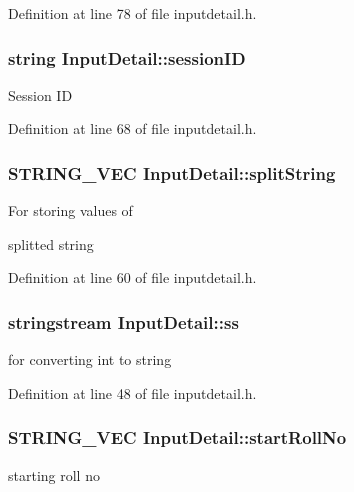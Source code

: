 Definition at line 78 of file inputdetail.\-h.

\hypertarget{classInputDetail_a1f276e4df260009d465032ec64f3a543}{
\subsubsection[{session\-I\-D}]{\setlength{\rightskip}{0pt plus 5cm}string Input\-Detail\-::session\-I\-D\hspace{0.3cm}{\ttfamily [protected]}}}\label{classInputDetail_a1f276e4df260009d465032ec64f3a543}
Session I\-D 

Definition at line 68 of file inputdetail.\-h.

\hypertarget{classInputDetail_ab09ed4176090a72237531cedf00afb41}{
\subsubsection[{split\-String}]{\setlength{\rightskip}{0pt plus 5cm}S\-T\-R\-I\-N\-G\-\_\-\-V\-E\-C Input\-Detail\-::split\-String\hspace{0.3cm}{\ttfamily [protected]}}}\label{classInputDetail_ab09ed4176090a72237531cedf00afb41}
\begin{DoxyVerb}        For storing values of 
\end{DoxyVerb}
 splitted string 

Definition at line 60 of file inputdetail.\-h.

\hypertarget{classInputDetail_a5284736b5fd3db0251cfeab7c581c0bd}{
\subsubsection[{ss}]{\setlength{\rightskip}{0pt plus 5cm}stringstream Input\-Detail\-::ss\hspace{0.3cm}{\ttfamily [protected]}}}\label{classInputDetail_a5284736b5fd3db0251cfeab7c581c0bd}
for converting int to string 

Definition at line 48 of file inputdetail.\-h.

\hypertarget{classInputDetail_a7262436753ac62bf068cc23b97049f61}{
\subsubsection[{start\-Roll\-No}]{\setlength{\rightskip}{0pt plus 5cm}S\-T\-R\-I\-N\-G\-\_\-\-V\-E\-C Input\-Detail\-::start\-Roll\-No\hspace{0.3cm}{\ttfamily [protected]}}}\label{classInputDetail_a7262436753ac62bf068cc23b97049f61}
starting roll no 

